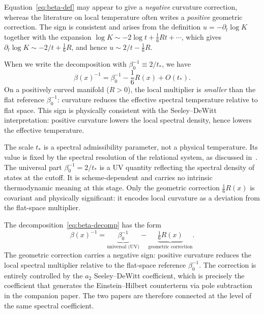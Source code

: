     \begin{remark}
      \label{rem:sign}
      Equation~\eqref{eq:beta-def} may appear to give a \emph{negative} curvature correction,
      whereas the literature on local temperature often writes a \emph{positive} geometric
      correction.
      The sign is consistent and arises from the definition $u = -\partial_t \log K$
      together with the expansion $\log K \sim -2\log t + \frac{1}{6}Rt + \cdots$,
      which gives $\partial_t \log K \sim -2/t + \frac{1}{6}R$,
      and hence $u \sim 2/t - \frac{1}{6}R$.

      When we write the decomposition with $\beta_0^{-1} \equiv 2/t_*$, we have
      \begin{equation}
        \beta(x)^{-1} = \beta_0^{-1} - \frac{1}{6}R(x) + O(t_*).
        \label{eq:beta-decomp}
      \end{equation}
      On a positively curved manifold ($R > 0$), the local multiplier is \emph{smaller}
      than the flat reference $\beta_0^{-1}$: curvature reduces the effective spectral
      temperature relative to flat space.
      This sign is physically consistent with the Seeley--DeWitt interpretation:
      positive curvature lowers the local spectral density, hence lowers the effective
      temperature.
    \end{remark}

    \begin{remark}
      \label{rem:tstar}
      The scale $t_*$ is a spectral admissibility parameter, not a physical temperature.
      Its value is fixed by the spectral resolution of the relational system, as discussed
      in~\cite{Spectral12}.
      The universal part $\beta_0^{-1} = 2/t_*$ is a UV quantity reflecting the spectral
      density of states at the cutoff.
      It is scheme-dependent and carries no intrinsic thermodynamic meaning at this stage.
      Only the geometric correction $\frac{1}{6}R(x)$ is covariant and physically
      significant: it encodes local curvature as a deviation from the flat-space multiplier.
    \end{remark}

    \begin{remark}
      \label{rem:decomp}
      The decomposition~\eqref{eq:beta-decomp} has the form
      \[
        \beta(x)^{-1}
        = \underbrace{\beta_0^{-1}}_{\text{universal (UV)}}
        - \underbrace{\tfrac{1}{6}R(x)}_{\text{geometric correction}}.
      \]
      The geometric correction carries a negative sign: positive curvature reduces the
      local spectral multiplier relative to the flat-space reference $\beta_0^{-1}$.
      The correction is entirely controlled by the $a_2$ Seeley--DeWitt coefficient,
      which is precisely the coefficient that generates the Einstein--Hilbert counterterm
      via pole subtraction in the companion paper.
      The two papers are therefore connected at the level of the same spectral coefficient.
    \end{remark}
